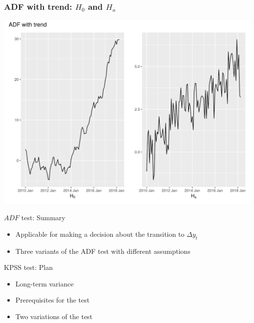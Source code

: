 \begin{frame}
	\frametitle{ADF with trend: $H_0$ and $H_a$}
	\includegraphics[width=\textwidth]{pictures/om_ts_06-060.png}
\end{frame}



\begin{frame}{$ADF$ test: Summary}
	
	\begin{itemize}[<+->]
		\item Applicable for making a decision about the transition to $\Delta y_t$
		\item Three variants of the ADF test with different assumptions		
	\end{itemize}
\end{frame}






\begin{frame} %
	
	
\end{frame}



\begin{frame}{KPSS test: Plan}
	\begin{itemize}[<+->]
		\item Long-term variance
		\item Prerequisites for the test
		\item Two variations of the test
	\end{itemize}
	
\end{frame}

